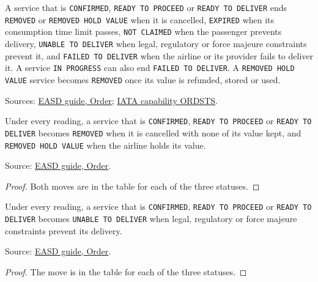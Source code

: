 \begin{definition}
  \label{def:delivery-end-service}
  A service that is \texttt{CONFIRMED}, \texttt{READY TO PROCEED} or
  \texttt{READY TO DELIVER} ends \texttt{REMOVED} or
  \texttt{REMOVED HOLD VALUE} when it is cancelled, \texttt{EXPIRED} when
  its consumption time limit passes, \texttt{NOT CLAIMED} when the
  passenger prevents delivery, \texttt{UNABLE TO DELIVER} when legal,
  regulatory or force majeure constraints prevent it, and
  \texttt{FAILED TO DELIVER} when the airline or its provider fails to
  deliver it.  A service \texttt{IN PROGRESS} can also end
  \texttt{FAILED TO DELIVER}.  A \texttt{REMOVED HOLD VALUE} service becomes
  \texttt{REMOVED} once its value is refunded, stored or used.

  Sources: \href{https://standards.atlassian.net/wiki/spaces/EASD/pages/574849062/Order}{EASD guide, Order};
  \href{https://retailing.iata.org/armi/docs/ORDSTS/}{IATA capability ORDSTS}.
\end{definition}

\begin{theorem}
  \label{thm:delivery-cancel}
  Under every reading, a service that is \texttt{CONFIRMED},
  \texttt{READY TO PROCEED} or \texttt{READY TO DELIVER} becomes
  \texttt{REMOVED} when it is cancelled with none of its value kept, and
  \texttt{REMOVED HOLD VALUE} when the airline holds its value.

  Source: \href{https://standards.atlassian.net/wiki/spaces/EASD/pages/574849062/Order}{EASD guide, Order}.
\end{theorem}
\begin{proof}
  Both moves are in the table for each of the three statuses.
\end{proof}

\begin{theorem}
  \label{thm:delivery-unable}
  Under every reading, a service that is \texttt{CONFIRMED},
  \texttt{READY TO PROCEED} or \texttt{READY TO DELIVER} becomes
  \texttt{UNABLE TO DELIVER} when legal, regulatory or force majeure
  constraints prevent its delivery.

  Source: \href{https://standards.atlassian.net/wiki/spaces/EASD/pages/574849062/Order}{EASD guide, Order}.
\end{theorem}
\begin{proof}
  The move is in the table for each of the three statuses.
\end{proof}

